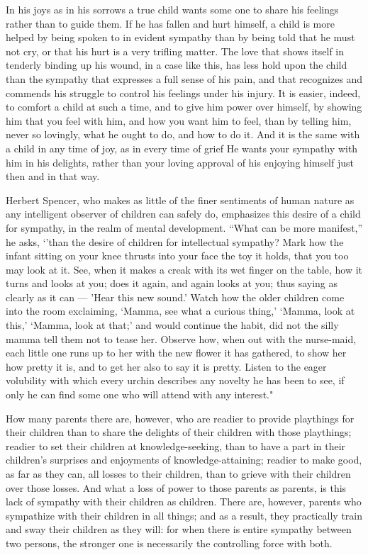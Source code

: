 \documentclass[
]{book}
\begin{document}
In his joys as in his sorrows a true child wants some one to share his feelings rather than to guide them. If he has fallen and hurt himself, a child is more helped by being spoken to in evident sympathy than by being told that he must not cry, or that his hurt is a very trifling matter. The love that shows itself in tenderly binding up his wound, in a case like this, has less hold upon the child than the sympathy that expresses a full sense of his pain, and that recognizes and commends his struggle to control his feelings under his injury. It is easier, indeed, to comfort a child at such a time, and to give him power over himself, by showing him that you feel with him, and how you want him to feel, than by telling him, never so lovingly, what he ought to do, and how to do it. And it is the same with a child in any time of joy, as in every time of grief He wants your sympathy with him in his delights, rather than your loving approval of his enjoying himself just then and in that way.

Herbert Spencer, who makes as little of the finer sentiments of human nature as any intelligent observer of children can safely do, emphasizes this desire of a child for sympathy, in the realm of mental development. ``What can be more manifest,'' he asks, `'than the desire of children for intellectual sympathy? Mark how the infant sitting on your knee thrusts into your face the toy it holds, that you too may look at it. See, when it makes a creak with its wet finger on the table, how it turns and looks at you; does it again, and again looks at you; thus saying as clearly as it can --- 'Hear this new sound.' Watch how the older children come into the room exclaiming, `Mamma, see what a curious thing,' `Mamma, look at this,' `Mamma, look at that;' and would continue the habit, did not the silly mamma tell them not to tease her. Observe how, when out with the nurse-maid, each little one runs up to her with the new flower it has gathered, to show her how pretty it is, and to get her also to say it is pretty. Listen to the eager volubility with which every urchin describes any novelty he has been to see, if only he can find some one who will attend with any interest."

How many parents there are, however, who are readier to provide playthings for their children than to share the delights of their children with those playthings; readier to set their children at knowledge-seeking, than to have a part in their children's surprises and enjoyments of knowledge-attaining; readier to make good, as far as they can, all losses to their children, than to grieve with their children over those losses. And what a loss of power to those parents as parents, is this lack of sympathy with their children as children. There are, however, parents who sympathize with their children in all things; and as a result, they practically train and sway their children as they will: for when there is entire sympathy between two persons, the stronger one is necessarily the controlling force with both.
\end{document}
